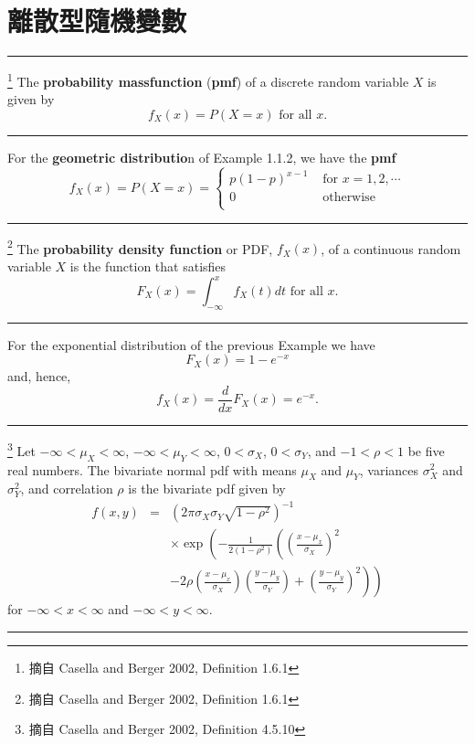 \section{{\MB 離散型隨機變數}}
\noindent \rule{\textwidth}{0.2pt}
\begin{de}\footnote{摘自 Casella and Berger 2002, Definition 1.6.1} %
The \textbf{probability massfunction} (\textbf{pmf}) of a discrete random variable $X$ is given by
\[f_X(x)=P(X=x) \mbox{ for all } x.\]
\noindent \rule{\textwidth}{0.2pt}
\end{de}
\bigskip
 
\begin{ex} %
For the \textbf{geometric distributio}n of Example 1.1.2, we have the \textbf{pmf}
\[f_X(x)=P(X=x)=\left\{\begin{array}{ll} p(1-p)^{x-1}  & \mbox{ for } x=1, 2, \cdots \\
                                              0        & \mbox{ otherwise } \\ \end{array}\right.\]
\end{ex}
\bigskip
\noindent \rule{\textwidth}{0.2pt}
\begin{de}\footnote{摘自 Casella and Berger 2002, Definition 1.6.1}  %
The \textbf{probability density function} or PDF, $f_X(x)$, of a continuous random variable $X$ is the function that
satisfies
\[F_X(x)=\int_{-\infty}^x f_X(t)dt \mbox{ for all } x.\]
\noindent \rule{\textwidth}{0.2pt}
\end{de}
\bigskip

\begin{ex} %
For the exponential distribution of the previous Example we have
\[F_X(x)=1-e^{-x}\]
and, hence,
\[f_X(x)=\frac{d}{dx}F_X(x)=e^{-x}.\]
\end{ex}
\bigskip

\noindent \rule{\textwidth}{0.2pt}
\begin{de}\footnote{摘自 Casella and Berger 2002, Definition 4.5.10}   %
Let $-\infty<\mu_X<\infty$, $-\infty<\mu_Y<\infty$, $0<\sigma_X$, $0<\sigma_Y$, and
$-1<\rho<1$ be five real numbers.  The bivariate normal pdf with means $\mu_X$ and $\mu_Y$,
variances $\sigma_X^2$ and $\sigma_Y^2$, and correlation $\rho$ is the bivariate pdf given by
\begin{eqnarray*}
f(x,y)&=&\left( 2\pi\sigma_X\sigma_Y\sqrt{1-\rho^2}\right)^{-1}\\
      && \times\exp\left(-\frac{1}{2(1-\rho^2)}\left(\left(\frac{x-\mu_x}{\sigma_X}\right)^2\right.\right.\\
      && \left.\left.-2\rho\left(\frac{x-\mu_x}{\sigma_X}\right)\left(\frac{y-\mu_y}{\sigma_Y}\right)
      +\left(\frac{y-\mu_y}{\sigma_Y}\right)^2 \right)\right)
\end{eqnarray*}
for $-\infty<x<\infty$ and $-\infty<y<\infty$.\\
\noindent \rule{\textwidth}{0.2pt}
\end{de}

